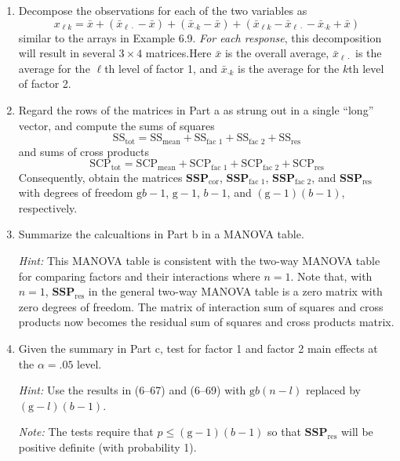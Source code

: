 \begin{enumerate}[label= (\alph*)]
    \item Decompose the observations for each of the two variables as
    \[
        x_{\ell k}
        =
        \bar{x}
        +
        (
            \bar{x}_{\ell \cdot}
            -
            \bar{x}
        )
        +
        (
            \bar{x}_{\cdot k}
            -
            \bar{x}
        )
        +
        (
            \bar{x}_{\ell k}
            -
            \bar{x}_{\ell \cdot}
            -
            \bar{x}_{\cdot k}
            +
            \bar{x}
        )
    \]
    similar to the arrays in Example 6.9. \textit{For each response}, this decomposition will result
in several $3 \times 4$ matrices.Here $\bar{x}$ is the overall average, $\bar{x}_{\ell \cdot}$ is the average for the $\ell$th
level of factor 1, and $\bar{x}_{\cdot k}$ is the average for the $k$th level of factor 2.
    \item Regard the rows of the matrices in Part a as strung out in a single ``long'' vector, and
    compute the sums of squares
    \[
        \text{SS}_{\text{tot}}
        =
        \text{SS}_{\text{mean}}
        +
        \text{SS}_{\text{fac 1}}
        +
        \text{SS}_{\text{fac 2}}
        +
        \text{SS}_{\text{res}}
    \]
    and sums of cross products
    \[
        \text{SCP}_{\text{tot}}
        =
        \text{SCP}_{\text{mean}}
        +
        \text{SCP}_{\text{fac 1}}
        +
        \text{SCP}_{\text{fac 2}}
        +
        \text{SCP}_{\text{res}}
    \]
    Consequently, obtain the matrices $\textbf{SSP}_{\text{cor}}$,
    $\textbf{SSP}_{\text{fac 1}}$,
    $\textbf{SSP}_{\text{fac 2}}$,
    and \newline $\textbf{SSP}_{\text{res}}$
    with degrees of freedom $\text{g}b - 1$, $\text{g} - 1$, $b - 1$, and $(\text{g} - 1)(b - 1)$, respectively.
    \item Summarize the calcualtions in Part b in a MANOVA table.
    
    \textit{Hint:} This MANOVA table is consistent with the two-way MANOVA table for comparing
factors and their interactions where $n = 1$. Note that, with $n = 1$, $\textbf{SSP}_{\text{res}}$ in the
general two-way MANOVA table is a zero matrix with zero degrees of freedom. The
matrix of interaction sum of squares and cross products now becomes the residual sum
of squares and cross products matrix.
    \item Given the summary in Part c, test for factor 1 and factor 2 main effects at the $\alpha = .05$ level.
    
    \textit{Hint:} Use the results in (6--67) and (6--69) with $\text{g}b(n - l)$ replaced by $(\text{g} - l)(b - 1)$.

    \textit{Note:} The tests require that $p \leq (\text{g} - 1) (b - 1)$ so that $\textbf{SSP}_{\text{res}}$ will be positive definite
    (with probability 1).
\end{enumerate}